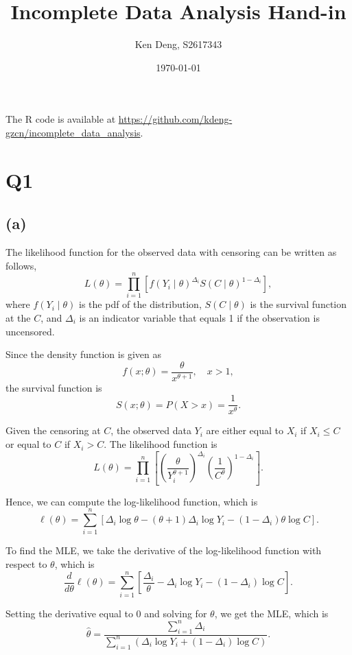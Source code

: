 \documentclass{article}
\title{Incomplete Data Analysis Hand-in}
\author{Ken Deng, S2617343}
\date{\today}
\begin{document}
\maketitle

The R code is available at \url{https://github.com/kdeng-gzcn/incomplete_data_analysis}.

\section{Q1}

\subsection{(a)}

The likelihood function for the observed data with censoring can be written as follows,
\[
L(\theta) = \prod_{i=1}^{n} \left[ f(Y_i \mid \theta)^{\Delta_i} S(C \mid \theta)^{1 - \Delta_i} \right],
\]
where \( f(Y_i \mid \theta) \) is the pdf of the distribution, \( S(C \mid \theta) \) is the survival function at the \( C \), and \( \Delta_i \) is an indicator variable that equals 1 if the observation is uncensored.

Since the density function is given as
\[
f(x; \theta) = \frac{\theta}{x^{\theta+1}}, \quad x > 1,
\]
the survival function is
\[
S(x; \theta) = P(X > x) = \frac{1}{x^{\theta}}.
\]

Given the censoring at \( C \), the observed data \( Y_i \) are either equal to \( X_i \) if \( X_i \leq C \) or equal to \( C \) if \( X_i > C \). The likelihood function is
\[
L(\theta) = \prod_{i=1}^{n} \left[ \left( \frac{\theta}{Y_i^{\theta+1}} \right)^{\Delta_i} \left( \frac{1}{C^\theta} \right)^{1 - \Delta_i} \right].
\]

Hence, we can compute the log-likelihood function, which is
\[
\ell(\theta) = \sum_{i=1}^{n} \left[ \Delta_i \log \theta - (\theta+1) \Delta_i \log Y_i - (1 - \Delta_i) \theta \log C \right].
\]

To find the MLE, we take the derivative of the log-likelihood function with respect to \( \theta \), which is
\[
\frac{d}{d\theta} \ell(\theta) = \sum_{i=1}^{n} \left[ \frac{\Delta_i}{\theta} - \Delta_i \log Y_i - (1 - \Delta_i) \log C \right].
\]

Setting the derivative equal to 0 and solving for \( \theta \), we get the MLE, which is
\[
\hat{\theta} = \frac{\sum_{i=1}^{n} \Delta_i}{\sum_{i=1}^{n} \left( \Delta_i \log Y_i + (1 - \Delta_i) \log C \right)}.
\]
\end{document}
